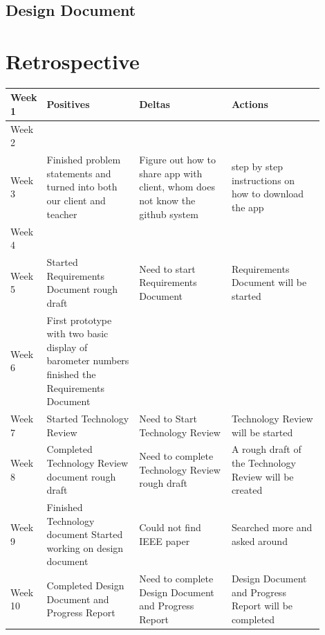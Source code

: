 \documentclass[onecolumn, draftclsnofoot,10pt, compsoc]{IEEEtran}
\begin{document}
\subsection{Design Document}

\section{Retrospective}
\begin{center}
	\begin{tabular}{| l | p{0.3\linewidth} | p{0.3\linewidth} | p{0.3\linewidth} |}
		\hline
		Week 1 & Positives & Deltas & Actions \\ \hline
		Week 2 & & & \\ \hline				%
		Week 3 & Finished problem statements and turned into both our client and teacher
 & Figure out how to share app with client, whom does not know the github system
 & step by step instructions on how to download the app \\ \hline
		Week 4 & & & \\ \hline
    Week 5 & Started Requirements Document rough draft & Need to start Requirements Document & Requirements Document will be started \\ \hline
		Week 6 & First prototype with two basic display of barometer numbers
  finished the Requirements Document & & \\ \hline
		Week 7 & Started Technology Review & Need to Start Technology Review & Technology Review will be started \\ \hline
		Week 8 & Completed Technology Review document rough draft & Need to complete Technology Review rough draft & A rough draft of the Technology Review will be created \\ \hline
		Week 9 &Finished Technology document
Started working on design document
 & Could not find IEEE paper & Searched more and asked around\\ \hline
		Week 10 & Completed Design Document and Progress Report & Need to complete Design Document and Progress Report & Design Document and Progress Report will be completed \\ \hline





	\end{tabular}
\end{center}
\end{document}
